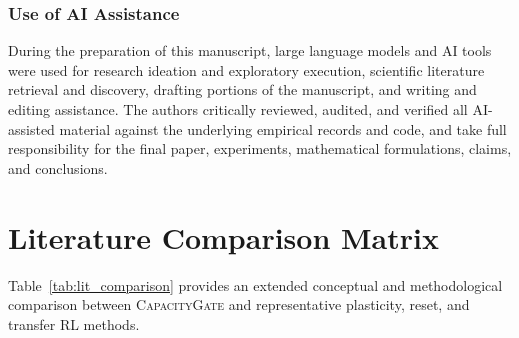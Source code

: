 \documentclass{article}
\begin{document}
\subsubsection*{Use of AI Assistance}
During the preparation of this manuscript, large language models and AI tools were used for research ideation and exploratory execution, scientific literature retrieval and discovery, drafting portions of the manuscript, and writing and editing assistance. The authors critically reviewed, audited, and verified all AI-assisted material against the underlying empirical records and code, and take full responsibility for the final paper, experiments, mathematical formulations, claims, and conclusions.




\newpage
\appendix

\section{Literature Comparison Matrix}
\label{app:lit_matrix}

Table~\ref{tab:lit_comparison} provides an extended conceptual and methodological comparison between \textsc{CapacityGate} and representative plasticity, reset, and transfer RL methods.
\end{document}
